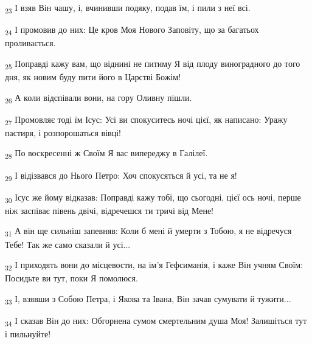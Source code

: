 \begin{tcolorbox}
\textsubscript{23} І взяв Він чашу, і, вчинивши подяку, подав їм, і пили з неї всі.
\end{tcolorbox}
\begin{tcolorbox}
\textsubscript{24} І промовив до них: Це кров Моя Нового Заповіту, що за багатьох проливається.
\end{tcolorbox}
\begin{tcolorbox}
\textsubscript{25} Поправді кажу вам, що віднині не питиму Я від плоду виноградного до того дня, як новим буду пити його в Царстві Божім!
\end{tcolorbox}
\begin{tcolorbox}
\textsubscript{26} А коли відспівали вони, на гору Оливну пішли.
\end{tcolorbox}
\begin{tcolorbox}
\textsubscript{27} Промовляє тоді їм Ісус: Усі ви спокуситесь ночі цієї, як написано: Уражу пастиря, і розпорошаться вівці!
\end{tcolorbox}
\begin{tcolorbox}
\textsubscript{28} По воскресенні ж Своїм Я вас випереджу в Галілеї.
\end{tcolorbox}
\begin{tcolorbox}
\textsubscript{29} І відізвався до Нього Петро: Хоч спокусяться й усі, та не я!
\end{tcolorbox}
\begin{tcolorbox}
\textsubscript{30} Ісус же йому відказав: Поправді кажу тобі, що сьогодні, цієї ось ночі, перше ніж заспіває півень двічі, відречешся ти тричі від Мене!
\end{tcolorbox}
\begin{tcolorbox}
\textsubscript{31} А він ще сильніш запевняв: Коли б мені й умерти з Тобою, я не відречуся Тебе! Так же само сказали й усі...
\end{tcolorbox}
\begin{tcolorbox}
\textsubscript{32} І приходять вони до місцевости, на ім'я Гефсиманія, і каже Він учням Своїм: Посидьте ви тут, поки Я помолюся.
\end{tcolorbox}
\begin{tcolorbox}
\textsubscript{33} І, взявши з Собою Петра, і Якова та Івана, Він зачав сумувати й тужити...
\end{tcolorbox}
\begin{tcolorbox}
\textsubscript{34} І сказав Він до них: Обгорнена сумом смертельним душа Моя! Залишіться тут і пильнуйте!
\end{tcolorbox}
